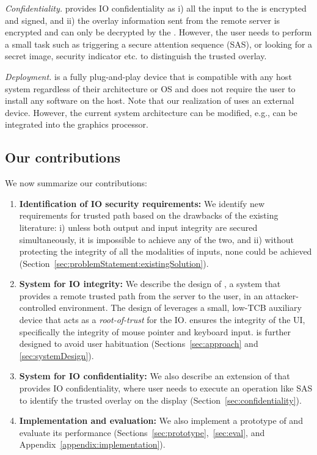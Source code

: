 \emph{Confidentiality.} \name provides IO confidentiality as i) all the input to the \device is encrypted and signed, and ii) the overlay information sent from the remote server is encrypted and can only be decrypted by the \device. However, the user needs to perform a small task such as triggering a secure attention sequence (SAS), or looking for a secret image, security indicator etc. to distinguish the trusted overlay.


\emph{Deployment.} \device is a fully plug-and-play device that is compatible with any host system regardless of their architecture or OS and does not require the user to install any software on the host. Note that our realization of \name uses an external device. However, the current system architecture can be modified, e.g., \device can be integrated into the graphics processor. 

\subsection{Our contributions} We now summarize our contributions:


\begin{enumerate}
  \item \textbf{Identification of IO security requirements:} We identify new requirements for trusted path based on the drawbacks of the existing literature: i) unless both output and input integrity are secured simultaneously, it is impossible to achieve any of the two, and ii) without protecting the integrity of all the modalities of inputs, none could be achieved (Section~\ref{sec:problemStatement:existingSolution}).
  
   
  \item \textbf{System for IO integrity:} We describe the design of \name, a system that provides a remote trusted path from the server to the user, in an attacker-controlled environment. The design of \name leverages a small, low-TCB auxiliary device that acts as a \emph{root-of-trust} for the IO. \name ensures the integrity of the UI, specifically the integrity of mouse pointer and keyboard input. \name is further designed to avoid user habituation (Sections~\ref{sec:approach} and \ref{sec:systemDesign}).
  
  \item \textbf{System for IO confidentiality:} We also describe an extension of \name that provides IO confidentiality, where user needs to execute an operation like SAS to identify the trusted overlay on the display (Section~\ref{sec:confidentiality}).
  
   
  \item \textbf{Implementation and evaluation:} We also implement a prototype of \name and evaluate its performance (Sections~\ref{sec:prototype},~\ref{sec:eval}, and Appendix~\ref{appendix:implementation}).
\end{enumerate}


